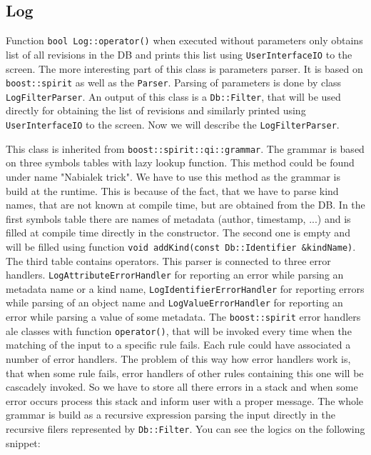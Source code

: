 \documentclass[deska]{subfiles}
\begin{document}
\subsection{Log}

Function {\tt bool Log::operator()} when executed without parameters only obtains list of all revisions in the DB and
prints this list using {\tt UserInterfaceIO} to the screen. The more interesting part of this class is parameters parser.
It is based on {\tt boost::spirit} as well as the {\tt Parser}. Parsing of parameters is done by class {\tt LogFilterParser}.
An output of this class is a {\tt Db::Filter}, that will be used directly for obtaining the list of revisions and similarly
printed using {\tt UserInterfaceIO} to the screen. Now we will describe the {\tt LogFilterParser}.

This class is inherited from {\tt boost::spirit::qi::grammar}. The grammar is based on three symbols tables with lazy lookup
function. This method could be found under name "Nabialek trick". We have to use this method as the grammar is build at
the runtime. This is because of the fact, that we have to parse kind names, that are not known at compile time, but are obtained
from the DB. In the first symbols table there are names of metadata (author, timestamp, ...) and is filled at compile time
directly in the constructor. The second one is empty and will be filled using function {\tt void addKind(const Db::Identifier &kindName)}.
The third table contains operators. This parser is connected to three error handlers. {\tt LogAttributeErrorHandler}
for reporting an error while parsing an metadata name or a kind name, {\tt LogIdentifierErrorHandler} for reporting errors
while parsing of an object name and {\tt LogValueErrorHandler} for reporting an error while parsing a value of some
metadata. The {\tt boost::spirit} error handlers ale classes with function {\tt operator()}, that will be invoked every time
when the matching of the input to a specific rule fails. Each rule could have associated a number of error handlers. The
problem of this way how error handlers work is, that when some rule fails, error handlers of other rules containing this one
will be cascadely invoked. So we have to store all there errors in a stack and when some error occurs process this stack
and inform user with a proper message. The whole grammar is build as a recursive expression parsing the input directly in the
recursive filers represented by {\tt Db::Filter}. You can see the logics on the following snippet:
\end{document}
